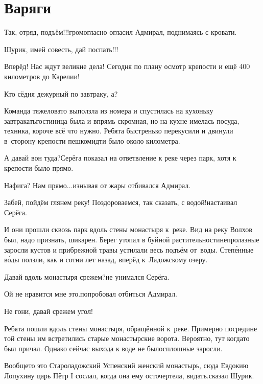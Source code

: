 \chapter{Варяги}
\vepsianrose
\fancyhead[LE]{\fancyplain{}{\bfseries \parttitle}}
\fancyhead[RO]{\fancyplain{}{\bfseries \rightmark}}

\diagdash Так, отряд, подъём!!!\mdash громогласно огласил Адмирал, поднимаясь с кровати.

\diagdash Шурик, имей совесть, дай поспать!!!

\diagdash Вперёд! Нас ждут великие дела! Сегодня по плану осмотр крепости и ещё 400 километров до Карелии!

\diagdash Кто сёдня дежурный по завтраку, а?

Команда тяжеловато выползла из номера и спустилась на кухоньку завтракать\mdash гостиница была и впрямь скромная, но на кухне имелась посуда, техника, короче всё что нужно. Ребята быстренько перекусили и двинули в~сторону крепости пешком\mdash идти было около километра.

\diagdash А давай вон туда?\mdash Серёга показал на ответвление к реке через парк, хотя к крепости было прямо.

\diagdash Нафига? Нам прямо$\ldots$\mdash изнывая от жары отбивался Адмирал.

\diagdash Забей, пойдём глянем реку! Поздороваемся, так сказать, с водой!\mdash настаивал Серёга.

И они прошли сквозь парк вдоль стены монастыря к~реке. Вид на реку Волхов был, надо признать, шикарен. Берег утопал в буйной растительности\mdash непролазные заросли кустов и прибрежной травы устилали весь подъём от~воды. Степ\'{е}нные в\'{о}ды ползли, как и сотни лет назад, вперёд к~Ладожскому озеру.

\diagdash Давай вдоль монастыря срежем?\mdash не унимался Серёга.

\diagdash Ой не нравится мне это.\mdash попробовал отбиться Адмирал.

\diagdash Не гони, давай срежем угол!

Ребята пошли вдоль стены монастыря, обращённой к~реке. Примерно посредине той стены им встретились старые монастырские ворота. Вероятно, тут когда\sdash то был причал. Однако сейчас выхода к воде не было\mdash сплошные заросли. 

\diagdash Вообще\sdash то это Староладожский Успенский женский монастырь, сюда Евдокию Лопухину царь Пётр I сослал, когда она ему осточертела, видать.\mdash сказал Шурик.

